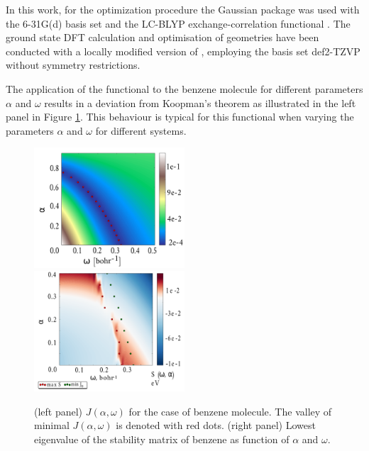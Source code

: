 In this work, for the optimization procedure the Gaussian package  \cite{g09} was used with the 6-31G(d) \cite{6-31g,6-31gd} basis set and the LC-BLYP exchange-correlation functional \cite{lcblyp}. 
The ground state DFT calculation and optimisation of geometries have been conducted with a locally modified version of  \cite{nwchem}, employing the basis set def2-TZVP \cite{def2tzvp} without symmetry restrictions.

The application of the functional  to the benzene molecule for different parameters $\alpha$ and $\omega$ results in a deviation from Koopman's theorem as illustrated in the left panel in Figure \ref{fig:Benzotrsh}.
This behaviour is typical for this functional when varying the parameters $\alpha$ and $\omega$ for different systems.
\begin{figure}
\includegraphics[width=0.5\textwidth]{Figures/Benzene/benzene2D}
\includegraphics[width=0.5\textwidth]{Figures/Benzene/benzene_S_stab_ion_cut_all.pdf}
\caption{(left panel) $J(\alpha,\omega)$ for the case of benzene molecule. The valley of minimal $J(\alpha,\omega)$ is denoted with red dots. (right panel) Lowest eigenvalue of the stability matrix of benzene as function of $\alpha$ and $\omega$. }
\label{fig:Benzotrsh}
\end{figure}
